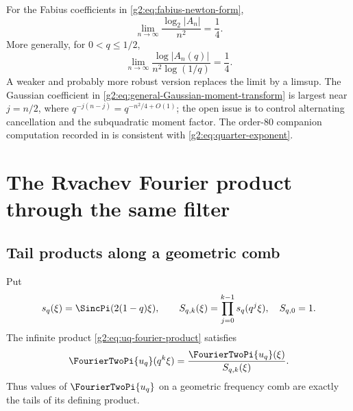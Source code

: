 \begin{conjecture}
\label{g2:conj:quarter-exponent}
For the Fabius coefficients in \eqref{g2:eq:fabius-newton-form},
\begin{equation}
 \lim_{n\to\infty}\frac{\log_2|A_n|}{n^2}=\frac14.
 \label{g2:eq:quarter-exponent}
\end{equation}
More generally, for $0<q\le1/2$,
\begin{equation}
 \lim_{n\to\infty}
 \frac{\log|A_n(q)|}{n^2\log(1/q)}=\frac14.
 \label{g2:eq:quarter-exponent-general}
\end{equation}
A weaker and probably more robust version replaces the limit by a limsup.  The
Gaussian coefficient in \eqref{g2:eq:general-Gaussian-moment-transform} is largest
near $j=n/2$, where $q^{-j(n-j)}=q^{-n^2/4+O(1)}$; the open issue is to control
alternating cancellation and the subquadratic moment factor.  The order-$80$
companion computation recorded in
is consistent with
\eqref{g2:eq:quarter-exponent}.
\end{conjecture}


\section{The Rvachev Fourier product through the same filter}
\label{g2:sec:rvachev-filter}

\subsection{Tail products along a geometric comb}

Put
\begin{equation}
 s_q(\xi)=\SincPi(2(1-q)\xi),
 \qquad
 S_{q,k}(\xi)=\prod_{j=0}^{k-1}s_q(q^j\xi),
 \quad S_{q,0}=1.
 \label{g2:eq:prefix-products}
\end{equation}
The infinite product \eqref{g2:eq:uq-fourier-product} satisfies
\begin{equation}
 \FourierTwoPi{u_q}(q^k\xi)
 =\frac{\FourierTwoPi{u_q}(\xi)}{S_{q,k}(\xi)}.
 \label{g2:eq:tail-product-ratio}
\end{equation}
Thus values of $\FourierTwoPi{u_q}$ on a geometric frequency comb are exactly the
tails of its defining product.

